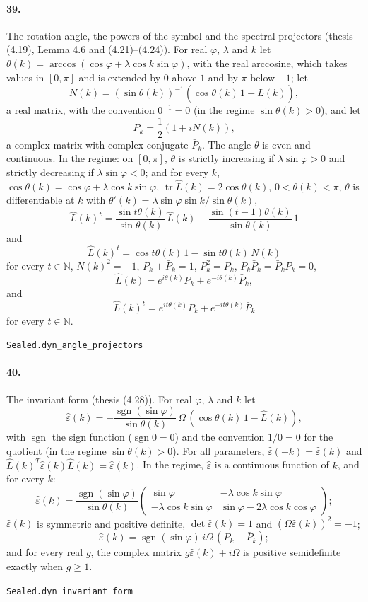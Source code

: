 \documentclass[11pt]{article}
\begin{document}
\paragraph{39.} The rotation angle, the powers of the symbol and the spectral projectors (thesis (4.19), Lemma 4.6 and (4.21)–(4.24)). For real $\varphi$, $\lambda$ and $k$ let $\theta(k) = \arccos(\cos\varphi + \lambda\cos k\sin\varphi)$, with the real arccosine, which takes values in $[0, \pi]$ and is extended by $0$ above $1$ and by $\pi$ below $-1$; let \[N(k) = (\sin\theta(k))^{-1}(\cos\theta(k)\, 1 - \hat L(k)),\] a real matrix, with the convention $0^{-1} = 0$ (in the regime $\sin\theta(k) > 0$), and let \[P_k = \frac12(1 + i N(k)),\] a complex matrix with complex conjugate $\bar P_k$. The angle $\theta$ is even and continuous. In the regime: on $[0, \pi]$, $\theta$ is strictly increasing if $\lambda\sin\varphi > 0$ and strictly decreasing if $\lambda\sin\varphi < 0$; and for every $k$, $\cos\theta(k) = \cos\varphi + \lambda\cos k\sin\varphi$, $\operatorname{tr}\hat L(k) = 2\cos\theta(k)$, $0 < \theta(k) < \pi$, $\theta$ is differentiable at $k$ with $\theta'(k) = \lambda\sin\varphi\sin k/\sin\theta(k)$, \[\hat L(k)^t = \frac{\sin t\theta(k)}{\sin\theta(k)}\, \hat L(k) - \frac{\sin (t - 1)\theta(k)}{\sin\theta(k)}\, 1\] and \[\hat L(k)^t = \cos t\theta(k)\, 1 - \sin t\theta(k)\, N(k)\] for every $t \in \mathbb N$, $N(k)^2 = -1$, $P_k + \bar P_k = 1$, $P_k^2 = P_k$, $P_k \bar P_k = \bar P_k P_k = 0$, \[\hat L(k) = e^{i\theta(k)} P_k + e^{-i\theta(k)} \bar P_k,\] and \[\hat L(k)^t = e^{it\theta(k)} P_k + e^{-it\theta(k)} \bar P_k\] for every $t \in \mathbb N$.\par{\footnotesize\texttt{Sealed.dyn\_angle\_projectors}}

\paragraph{40.} The invariant form (thesis (4.28)). For real $\varphi$, $\lambda$ and $k$ let \[\hat\varepsilon(k) = -\frac{\operatorname{sgn}(\sin\varphi)}{\sin\theta(k)}\, \Omega\,(\cos\theta(k)\, 1 - \hat L(k)),\] with $\operatorname{sgn}$ the sign function ($\operatorname{sgn} 0 = 0$) and the convention $1/0 = 0$ for the quotient (in the regime $\sin\theta(k) > 0$). For all parameters, $\hat\varepsilon(-k) = \hat\varepsilon(k)$ and $\hat L(k)^T \hat\varepsilon(k) \hat L(k) = \hat\varepsilon(k)$. In the regime, $\hat\varepsilon$ is a continuous function of $k$, and for every $k$: \[\hat\varepsilon(k) = \frac{\operatorname{sgn}(\sin\varphi)}{\sin\theta(k)} \begin{pmatrix} \sin\varphi & -\lambda\cos k\sin\varphi \\ -\lambda\cos k\sin\varphi & \sin\varphi - 2\lambda\cos k\cos\varphi \end{pmatrix};\] $\hat\varepsilon(k)$ is symmetric and positive definite, $\det\hat\varepsilon(k) = 1$ and $(\Omega\hat\varepsilon(k))^2 = -1$; \[\hat\varepsilon(k) = \operatorname{sgn}(\sin\varphi)\, i\Omega\,(P_k - \bar P_k);\] and for every real $g$, the complex matrix $g\hat\varepsilon(k) + i\Omega$ is positive semidefinite exactly when $g \ge 1$.\par{\footnotesize\texttt{Sealed.dyn\_invariant\_form}}
\end{document}
